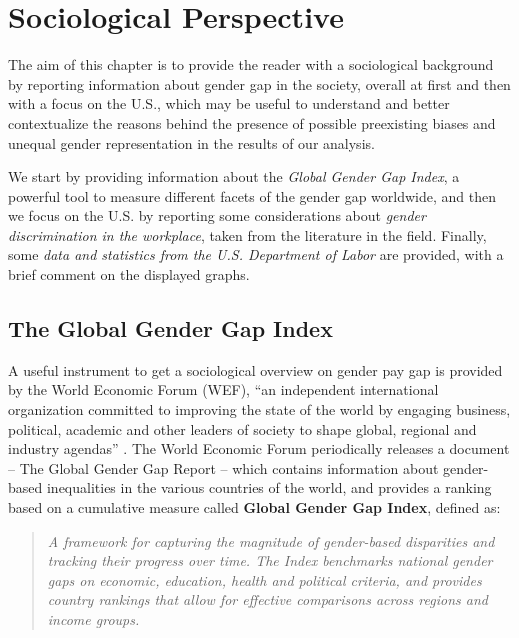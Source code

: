 \chapter{Sociological Perspective}
\label{chapter:sociological_perspective}
\thispagestyle{empty}

The aim of this chapter is to provide the reader with a sociological background by reporting information about gender gap in the society, overall at first and then with a focus on the U.S., which may be useful to understand and better contextualize the reasons behind the presence of possible preexisting biases and unequal gender representation in the results of our analysis.

We start by providing information about the \textit{Global Gender Gap Index}, a powerful tool to measure different facets of the gender gap worldwide, and then we focus on the U.S. by reporting some considerations about \textit{gender discrimination in the workplace}, taken from the literature in the field. Finally, some \textit{data and statistics from the U.S. Department of Labor} are provided, with a brief comment on the displayed graphs.


\section{The Global Gender Gap Index}
A useful instrument to get a sociological overview on gender pay gap is provided by the World Economic Forum (WEF), ``an independent international organization committed to improving the state of the world by engaging business, political, academic and other leaders of society to shape global, regional and industry agendas'' \cite{world2021terms}. The World Economic Forum periodically releases a document -- The Global Gender Gap Report -- which contains information about gender-based inequalities in the various countries of the world, and provides a ranking based on a cumulative measure called \textbf{Global Gender Gap Index}, defined as:
\begin{quote}\emph{A framework for capturing the magnitude of gender-based disparities and tracking their progress over time. The Index benchmarks national gender gaps on economic, education, health and political criteria, and provides country rankings that allow for effective comparisons across regions and income groups.} \cite[p.~3]{schwab2017global}\end{quote}


